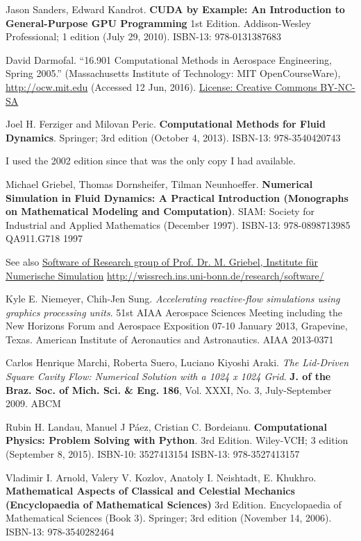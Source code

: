\documentclass[10pt]{amsart}
\begin{document}
\begin{thebibliography}{9}
Jason Sanders, Edward Kandrot.  \textbf{CUDA by Example: An Introduction to General-Purpose GPU Programming} 1st Edition.  Addison-Wesley Professional; 1 edition (July 29, 2010).  ISBN-13: 978-0131387683

  David Darmofal. ``16.901 Computational Methods in Aerospace Engineering, Spring 2005.'' (Massachusetts Institute of Technology: MIT OpenCourseWare), \url{http://ocw.mit.edu} (Accessed 12 Jun, 2016). \href{http://creativecommons.org/licenses/by-nc-sa/4.0/}{License: Creative Commons BY-NC-SA}

Joel H. Ferziger and Milovan Peric.  \textbf{Computational Methods for Fluid Dynamics}.  Springer; 3rd edition (October 4, 2013).  ISBN-13: 978-3540420743

I used the 2002 edition since that was the only copy I had available.  

Michael Griebel, Thomas Dornsheifer, Tilman Neunhoeffer.  \textbf{Numerical Simulation in Fluid Dynamics: A Practical Introduction (Monographs on Mathematical Modeling and Computation)}.  SIAM: Society for Industrial and Applied Mathematics (December 1997).  ISBN-13: 978-0898713985  QA911.G718  1997
  
See also \href{http://wissrech.ins.uni-bonn.de/research/software/}{Software of Research group of Prof. Dr. M. Griebel, Institute f\"{u}r Numerische Simulation} \url{http://wissrech.ins.uni-bonn.de/research/software/}

Kyle E. Niemeyer, Chih-Jen Sung.  \emph{Accelerating reactive-flow simulations using graphics processing units}.  51st AIAA Aerospace Sciences Meeting including the New Horizons Forum and Aerospace Exposition 07-10 January 2013, Grapevine, Texas. American Institute of Aeronautics and Astronautics.  AIAA 2013-0371

  Carlos Henrique Marchi, Roberta Suero, Luciano Kiyoshi Araki.  \emph{The Lid-Driven Square Cavity Flow: Numerical Solution with a 1024 x 1024 Grid}.  \textbf{J. of the Braz. Soc. of Mich. Sci. \& Eng.}  \textbf{186}, Vol. XXXI, No. 3, July-September 2009.  ABCM

Rubin H. Landau, Manuel J P\'{a}ez, Cristian C. Bordeianu.  \textbf{Computational Physics: Problem Solving with Python}.  3rd Edition.  Wiley-VCH; 3 edition (September 8, 2015).  ISBN-10: 3527413154  ISBN-13: 978-3527413157


Vladimir I. Arnold, Valery V. Kozlov, Anatoly I. Neishtadt, E. Khukhro.  \textbf{Mathematical Aspects of Classical and Celestial Mechanics (Encyclopaedia of Mathematical Sciences)} 3rd Edition.  Encyclopaedia of Mathematical Sciences (Book 3).  Springer; 3rd edition (November 14, 2006).  ISBN-13: 978-3540282464



  
\end{thebibliography}
\end{document}
